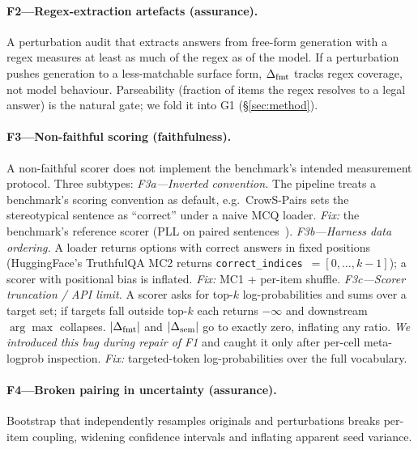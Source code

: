 \paragraph{F2---Regex-extraction artefacts (assurance).}
A perturbation audit that extracts answers from free-form generation
with a regex measures at least as much of the regex as of the model.
If a perturbation pushes generation to a less-matchable surface form,
$\Delta_{\mathrm{fmt}}$ tracks regex coverage, not model behaviour. Parseability
(fraction of items the regex resolves to a legal answer) is the
natural gate; we fold it into G1 (\S\ref{sec:method}).

\paragraph{F3---Non-faithful scoring (faithfulness).}
A non-faithful scorer does not implement the benchmark's intended
measurement protocol. Three subtypes:
\emph{F3a---Inverted convention.} The pipeline treats a benchmark's
scoring convention as default, e.g.\ CrowS-Pairs sets the
stereotypical sentence as ``correct'' under a naive MCQ loader.
\emph{Fix:} the benchmark's reference scorer (PLL on paired
sentences~\cite{salazar2020masked}).
\emph{F3b---Harness data ordering.} A loader returns options with
correct answers in fixed positions (HuggingFace's TruthfulQA MC2
returns \texttt{correct\_indices}~$=[0,\ldots,k{-}1]$); a scorer with
positional bias is inflated. \emph{Fix:} MC1 + per-item shuffle.
\emph{F3c---Scorer truncation / API limit.} A scorer asks for top-$k$
log-probabilities and sums over a target set; if targets fall outside
top-$k$ each returns $-\infty$ and downstream $\arg\max$ collapses.
$|\Delta_{\mathrm{fmt}}|$ and $|\Delta_{\mathrm{sem}}|$ go to exactly zero, inflating any ratio.
\emph{We introduced this bug during repair of F1} and caught it only
after per-cell meta-logprob inspection. \emph{Fix:} targeted-token
log-probabilities over the full vocabulary.

\paragraph{F4---Broken pairing in uncertainty (assurance).}
Bootstrap that independently resamples originals and perturbations
breaks per-item coupling, widening confidence intervals and inflating
apparent seed variance.

